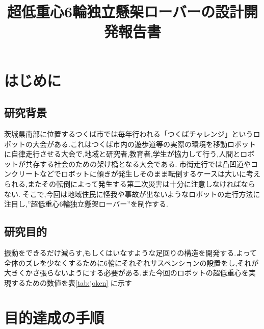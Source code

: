 \documentclass[a4paper]{jarticle}
\begin{document}
\title{超低重心6輪独立懸架ローバーの設計開発報告書}


\maketitle

\section{はじめに}
\subsection{研究背景}
茨城県南部に位置するつくば市では毎年行われる「つくばチャレンジ」というロボットの大会がある.これはつくば市内の遊歩道等の実際の環境を移動ロボットに自律走行させる大会で,地域と研究者,教育者,学生が協力して行う,人間とロボットが共存する社会のための架け橋となる大会である. 
市街走行では凸凹道やコンクリートなどでロボットに傾きが発生しそのまま転倒するケースは大いに考えられる,またその転倒によって発生する第二次災害は十分に注意しなければならない.
そこで,今回は地域住民に怪我や事故が出ないようなロボットの走行方法に注目し,”超低重心6輪独立懸架ローバー”を制作する.




\subsection{研究目的}
振動をできるだけ減らす,もしくはいなすような足回りの構造を開発する.よって全体のズレを少なくするために6輪にそれぞれサスペンションの設置をし,それが大きくかさ張らないようにする必要がある.また今回のロボットの超低重心を実現するための数値を表\ref{tab:joken} に示す


\section{目的達成の手順}
\end{document}
